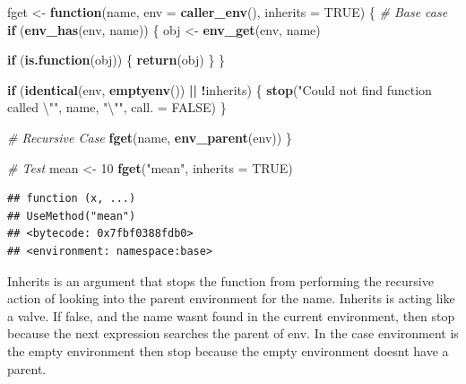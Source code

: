 \documentclass[]{book}
\newenvironment{Shaded}{\begin{snugshade}}{\end{snugshade}}
\newcommand{\CharTok}[1]{\textcolor[rgb]{0.31,0.60,0.02}{#1}}
\newcommand{\CommentTok}[1]{\textcolor[rgb]{0.56,0.35,0.01}{\textit{#1}}}
\newcommand{\ControlFlowTok}[1]{\textcolor[rgb]{0.13,0.29,0.53}{\textbf{#1}}}
\newcommand{\DataTypeTok}[1]{\textcolor[rgb]{0.13,0.29,0.53}{#1}}
\newcommand{\DecValTok}[1]{\textcolor[rgb]{0.00,0.00,0.81}{#1}}
\newcommand{\KeywordTok}[1]{\textcolor[rgb]{0.13,0.29,0.53}{\textbf{#1}}}
\newcommand{\NormalTok}[1]{#1}
\newcommand{\OperatorTok}[1]{\textcolor[rgb]{0.81,0.36,0.00}{\textbf{#1}}}
\newcommand{\OtherTok}[1]{\textcolor[rgb]{0.56,0.35,0.01}{#1}}
\newcommand{\StringTok}[1]{\textcolor[rgb]{0.31,0.60,0.02}{#1}}
\begin{document}
\begin{Shaded}
\begin{Highlighting}[]
\NormalTok{fget <-}\StringTok{ }\ControlFlowTok{function}\NormalTok{(name, }\DataTypeTok{env =} \KeywordTok{caller_env}\NormalTok{(), }\DataTypeTok{inherits =} \OtherTok{TRUE}\NormalTok{) \{}
  \CommentTok{# Base case}
  \ControlFlowTok{if}\NormalTok{ (}\KeywordTok{env_has}\NormalTok{(env, name)) \{}
\NormalTok{    obj <-}\StringTok{ }\KeywordTok{env_get}\NormalTok{(env, name)}

    \ControlFlowTok{if}\NormalTok{ (}\KeywordTok{is.function}\NormalTok{(obj)) \{}
      \KeywordTok{return}\NormalTok{(obj)}
\NormalTok{    \}}
\NormalTok{  \}}

  \ControlFlowTok{if}\NormalTok{ (}\KeywordTok{identical}\NormalTok{(env, }\KeywordTok{emptyenv}\NormalTok{()) }\OperatorTok{||}\StringTok{ }\OperatorTok{!}\NormalTok{inherits) \{}
    \KeywordTok{stop}\NormalTok{(}\StringTok{"Could not find function called }\CharTok{\textbackslash{}"}\StringTok{"}\NormalTok{, name, }\StringTok{"}\CharTok{\textbackslash{}"}\StringTok{"}\NormalTok{, }\DataTypeTok{call. =} \OtherTok{FALSE}\NormalTok{)}
\NormalTok{  \}}

  \CommentTok{# Recursive Case}
  \KeywordTok{fget}\NormalTok{(name, }\KeywordTok{env_parent}\NormalTok{(env))}
\NormalTok{\}}
\end{Highlighting}
\end{Shaded}

\begin{Shaded}
\begin{Highlighting}[]
\CommentTok{# Test}
\NormalTok{mean <-}\StringTok{ }\DecValTok{10}
\KeywordTok{fget}\NormalTok{(}\StringTok{"mean"}\NormalTok{, }\DataTypeTok{inherits =} \OtherTok{TRUE}\NormalTok{)}
\end{Highlighting}
\end{Shaded}

\begin{verbatim}
## function (x, ...) 
## UseMethod("mean")
## <bytecode: 0x7fbf0388fdb0>
## <environment: namespace:base>
\end{verbatim}

Inherits is an argument that stops the function from performing the recursive action of looking into the parent environment for the name. Inherits is acting like a valve. If false, and the name wasnt found in the current environment, then stop because the next expression searches the parent of env. In the case environment is the empty environment then stop because the empty environment doesnt have a parent.
\end{document}
